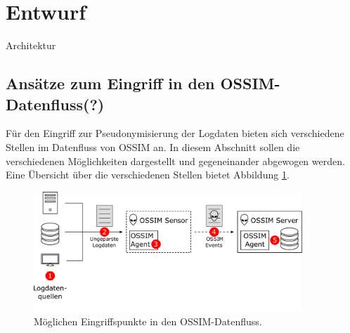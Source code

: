 \section{Entwurf}

\label{sec_impl_architecture}

Architektur








\subsection*{Ansätze zum Eingriff in den OSSIM-Datenfluss(?)}


Für den Eingriff zur Pseudonymisierung der Logdaten bieten sich verschiedene Stellen im Datenfluss von OSSIM an. In diesem Abschnitt sollen die verschiedenen Möglichkeiten dargestellt und gegeneinander abgewogen werden. Eine Übersicht über die verschiedenen Stellen bietet Abbildung \ref{fig:ossim_data_access_point}.

\begin{figure}[]
    \centering
        \includegraphics[width=0.9\textwidth]{dia/ossim_data_access_point.pdf}
    \caption{Möglichen Eingriffspunkte in den OSSIM-Datenfluss.}
    \label{fig:ossim_data_access_point}
\end{figure}

